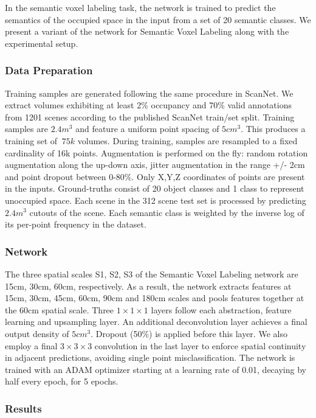 \documentclass[runningheads]{llncs}
\begin{document}
In the semantic voxel labeling task, the network is trained to predict the semantics of the occupied space in the input from a set of 20 semantic classes. We present a variant of the network for Semantic Voxel Labeling along with the experimental setup. 

\subsubsection{Data Preparation}

Training samples are generated following the same procedure in ScanNet. We extract volumes exhibiting at least 2\% occupancy and 70\% valid annotations from 1201 scenes according to the published ScanNet train/set split. Training samples are $2.4m^3$ and feature a uniform point spacing of $5cm^3$. This produces a training set of $~75k$ volumes. During training, samples are resampled to a fixed cardinality of 16k points. Augmentation is performed on the fly: random rotation augmentation along the up-down axis, jitter augmentation in the range +/- 2cm and point dropout between 0-80\%. Only X,Y,Z coordinates of points are present in the inputs. Ground-truths consist of 20 object classes and 1 class to represent unoccupied space. Each scene in the 312 scene test set is processed by predicting $2.4m^3$ cutouts of the scene. Each semantic class is weighted by the inverse log of its per-point frequency in the dataset.

\subsubsection{Network}

The three spatial scales S1, S2, S3 of the Semantic Voxel Labeling network are 15cm, 30cm, 60cm, respectively. As a result, the network extracts features at 15cm, 30cm, 45cm, 60cm, 90cm and 180cm scales and pools features together at the 60cm spatial scale. Three $1\times 1\times 1$ layers follow each abstraction, feature learning and upsampling layer. An additional deconvolution layer achieves a final output density of $5cm^3$. Dropout (50\%) is applied before this layer. We also employ a final $3\times 3\times 3$ convolution in the last layer to enforce spatial continuity in adjacent predictions, avoiding single point misclassification. The network is trained with an ADAM optimizer starting at a learning rate of 0.01, decaying by half every epoch, for 5 epochs.

\subsubsection{Results}
\end{document}
